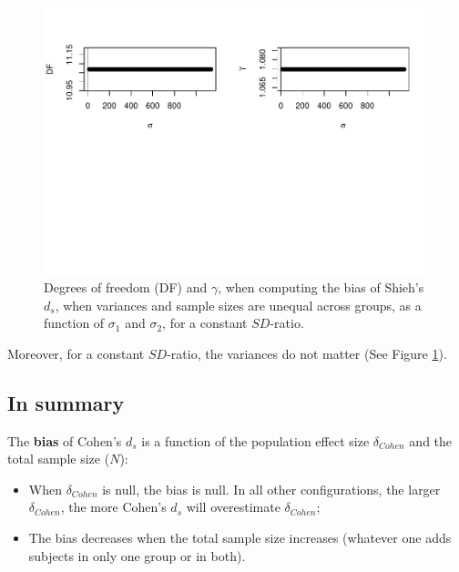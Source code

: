 \documentclass[
  english,
  man]{apa6}
\providecommand{\tightlist}{%
  \setlength{\itemsep}{0pt}\setlength{\parskip}{0pt}}
\begin{document}
\begin{figure}
\centering
\includegraphics{Theoretical-Bias-of-all-estimators-as-a-function-of-population-parameters_files/figure-latex/biasshiehhetunbalvariance2-1.pdf}
\caption{\label{fig:biasshiehhetunbalvariance2}Degrees of freedom (DF) and \(\gamma\), when computing the bias of Shieh's \(d_s\), when variances and sample sizes are unequal across groups, as a function of \(\sigma_1\) and \(\sigma_2\), for a constant \(SD\)-ratio.}
\end{figure}

Moreover, for a constant \(SD\)-ratio, the variances do not matter (See Figure \ref{fig:biasshiehhetunbalvariance2}).

\hypertarget{in-summary}{%
\subsection{In summary}\label{in-summary}}

The \textbf{bias} of Cohen's \(d_s\) is a function of the population effect size \(\delta_{Cohen}\) and the total sample size (\(N\)):

\begin{itemize}
\tightlist
\item
  When \(\delta_{Cohen}\) is null, the bias is null. In all other configurations, the larger \(\delta_{Cohen}\), the more Cohen's \(d_s\) will overestimate \(\delta_{Cohen}\);\\
\item
  The bias decreases when the total sample size increases (whatever one adds subjects in only one group or in both).
\end{itemize}
\end{document}
